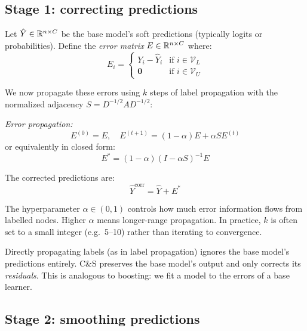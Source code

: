 \begin{notechapter}
\subsection{Stage 1: correcting predictions}

Let $\hat{Y} \in \mathbb{R}^{n \times C}$ be the base model's soft predictions
(typically logits or probabilities). Define the \emph{error matrix}
$E \in \mathbb{R}^{n \times C}$ where:
\begin{equation}
E_{i} = \begin{cases}
Y_i - \hat{Y}_i & \text{if } i \in \mathcal{V}_L \\
\mathbf{0} & \text{if } i \in \mathcal{V}_U
\end{cases}
\end{equation}

We now propagate these errors using $k$ steps of label propagation with the
normalized adjacency $S = D^{-1/2}AD^{-1/2}$:

\begin{keyidea}
\emph{Error propagation:}
\begin{equation}
E^{(0)} = E, \quad E^{(t+1)} = (1-\alpha) E + \alpha S E^{(t)}
\end{equation}
or equivalently in closed form:
\begin{equation}
E^* = (1-\alpha)(I - \alpha S)^{-1} E
\end{equation}

The corrected predictions are:
\begin{equation}
\hat{Y}^{\text{corr}} = \hat{Y} + E^*
\end{equation}
\end{keyidea}

The hyperparameter $\alpha \in (0,1)$ controls how much error information flows
from labelled nodes. Higher $\alpha$ means longer-range propagation. In practice,
$k$ is often set to a small integer (e.g.\ 5--10) rather than iterating to
convergence.

\begin{remark}
Directly propagating labels (as in label propagation) ignores the base model's
predictions entirely. C\&S preserves the base model's output and only corrects
its \emph{residuals}. This is analogous to boosting: we fit a model to the
errors of a base learner.
\end{remark}

\subsection{Stage 2: smoothing predictions}


\end{notechapter}
